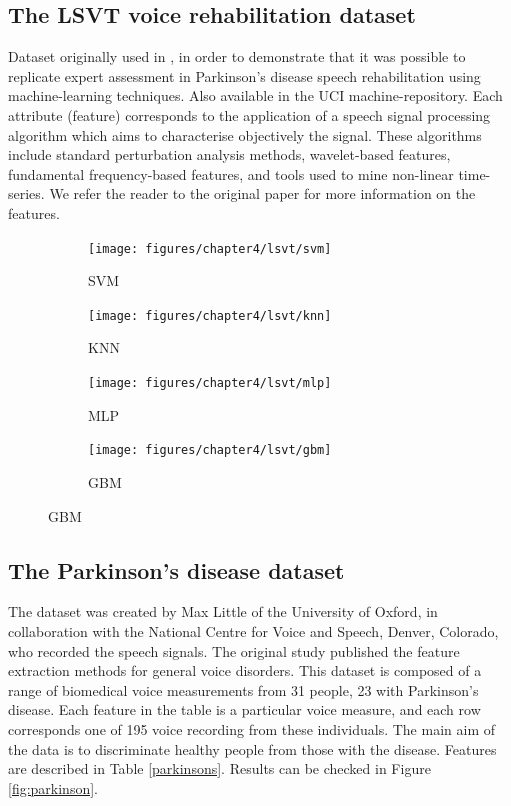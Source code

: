 \documentclass[10pt,a4paper,twoside]{book}
\begin{document}
\subsection{The LSVT voice rehabilitation dataset}

Dataset originally used in \cite{Tsanas2014}, in order to demonstrate that it was possible to replicate expert assessment in Parkinson's disease speech rehabilitation using machine-learning techniques. Also available in the UCI machine-repository. Each attribute (feature) corresponds to the application of a speech signal processing algorithm which aims to characterise objectively the signal. These algorithms include standard perturbation analysis methods, wavelet-based features, fundamental frequency-based features, and tools used to mine non-linear time-series. We refer the reader to the original paper for more information on the features.

\begin{figure}[ht]
  \centering
  \caption{Benchmarking results for the LSVT Voice Rehabilitation dataset.}
  \begin{subfigure}[t]{0.5\textwidth}
  	\caption{SVM}
    \centering\texttt{[image: figures/chapter4/lsvt/svm]}
  \end{subfigure}%
  \begin{subfigure}[t]{0.5\textwidth}
    \caption{KNN}
    \centering\texttt{[image: figures/chapter4/lsvt/knn]}
  \end{subfigure}
    \begin{subfigure}[t]{0.5\textwidth}
    \caption{MLP}
    \centering\texttt{[image: figures/chapter4/lsvt/mlp]}
  \end{subfigure}%
    \begin{subfigure}[t]{0.5\textwidth}
    \caption{GBM}
    \centering\texttt{[image: figures/chapter4/lsvt/gbm]}
  \end{subfigure}
  \label{fig:breastcancer}
\end{figure}

\subsection{The Parkinson's disease dataset}

The dataset was created by Max Little of the University of Oxford, in collaboration with the National Centre for Voice and Speech, Denver, Colorado, who recorded the speech signals. The original study \cite{Little2007} published the feature extraction methods for general voice disorders. This dataset is composed of a range of biomedical voice measurements from 31 people, 23 with Parkinson's disease. Each feature in the table is a particular voice measure, and each row corresponds one of 195 voice recording from these individuals. The main aim of the data is to discriminate healthy people from those with the disease. Features are described in Table \ref{parkinsons}. Results can be checked in Figure \ref{fig:parkinson}.
\end{document}
